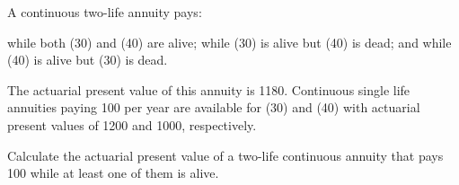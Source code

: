 A continuous two-life annuity pays:
\begin{description}
   while both (30) and (40) are alive;
   while (30) is alive but (40) is dead; and
   while (40) is alive but (30) is dead.
\end{description}
The actuarial present value of this annuity is 1180. Continuous single life annuities
paying 100 per year are available for (30) and (40) with actuarial present values of 1200
and 1000, respectively.

Calculate the actuarial present value of a two-life continuous annuity that pays 100 while
at least one of them is alive.
